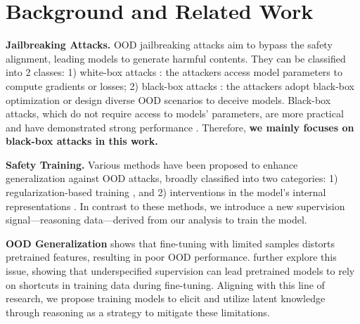 \section{Background and Related Work}
\vspace{-0.03cm}
\textbf{Jailbreaking Attacks.}  OOD jailbreaking attacks aim to bypass the safety alignment, leading models to generate harmful contents. They can be classified into 2 classes: 1) white-box attacks \cite{gcg,liu2023autodan,geisler2024attacking}: the attackers access model parameters to compute gradients or losses; 2) black-box attacks \cite{PAIR, wei2023jailbroken, shen2024anything, gptsmart, zeng2024johnny}: the attackers adopt black-box optimization or design diverse OOD scenarios to deceive models. Black-box attacks, which do not require access to models' parameters, are more practical and have demonstrated strong performance \cite{mazeika2024harmbench}. Therefore, \textbf{we mainly focuses on black-box attacks in this work.}



\vspace{-0.13cm}
\textbf{Safety Training.} Various methods have been proposed to enhance generalization against OOD attacks, broadly classified into two categories: 1) regularization-based training \cite{youliang,qi2024safety}, and 2) interventions in the model’s internal representations \cite{zou2024improving,sheshadri2024latent}. In contrast to these methods, we introduce a new supervision signal—reasoning data—derived from our analysis to train the model. 

\vspace{-0.13cm}
\textbf{OOD Generalization} \citet{kumar2022fine} shows that fine-tuning with limited samples distorts pretrained features, resulting in poor OOD performance. \citet{izmailov2022feature,lee2022diversify} further explore this issue, showing that underspecified supervision can lead pretrained models to rely on shortcuts in training data during fine-tuning. Aligning with this line of research, we propose training models to elicit and utilize latent knowledge through reasoning as a strategy to mitigate these limitations.

